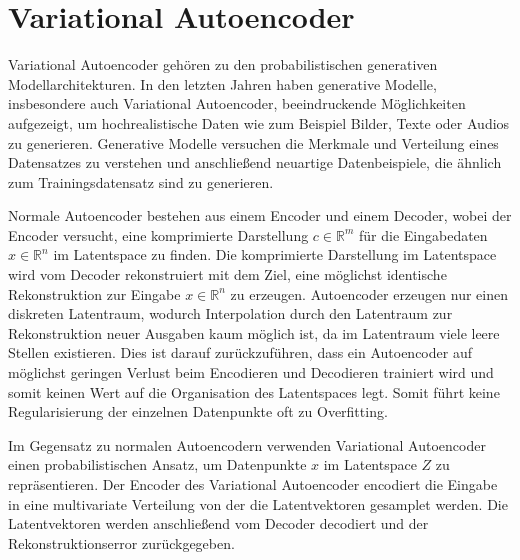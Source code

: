 \section{Variational Autoencoder}\raggedbottom
Variational Autoencoder \citep{kingma2014autoencoding} gehören zu den probabilistischen generativen Modellarchitekturen. In den letzten Jahren haben generative Modelle, insbesondere auch Variational Autoencoder, beeindruckende Möglichkeiten aufgezeigt, um hochrealistische Daten wie zum Beispiel Bilder, Texte oder Audios zu generieren.
Generative Modelle versuchen die Merkmale und Verteilung eines Datensatzes zu verstehen und anschließend neuartige Datenbeispiele, die ähnlich zum Trainingsdatensatz sind zu generieren.

Normale Autoencoder bestehen aus einem Encoder und einem Decoder, wobei der Encoder versucht, eine komprimierte Darstellung $c \in \mathbb{R}^{m}$ für die Eingabedaten $x \in \mathbb{R}^{n}$ im Latentspace zu finden. Die komprimierte Darstellung im Latentspace wird vom Decoder rekonstruiert mit dem Ziel, eine möglichst identische Rekonstruktion zur Eingabe $x \in \mathbb{R}^{n}$ zu erzeugen.
Autoencoder erzeugen nur einen diskreten Latentraum, wodurch Interpolation durch den Latentraum zur Rekonstruktion neuer Ausgaben kaum möglich ist, da im Latentraum viele leere Stellen existieren. 
Dies ist darauf zurückzuführen, dass ein Autoencoder auf möglichst geringen Verlust beim Encodieren und Decodieren trainiert wird und somit keinen Wert auf die Organisation des Latentspaces legt. 
Somit führt keine Regularisierung der einzelnen Datenpunkte oft zu Overfitting.

Im Gegensatz zu normalen Autoencodern verwenden Variational Autoencoder einen probabilistischen Ansatz, um Datenpunkte $x$ im Latentspace $Z$ zu repräsentieren. 
Der Encoder des Variational Autoencoder encodiert die Eingabe in eine multivariate Verteilung von der die Latentvektoren gesamplet werden. 
Die Latentvektoren werden anschließend vom Decoder decodiert und der Rekonstruktionserror zurückgegeben.

